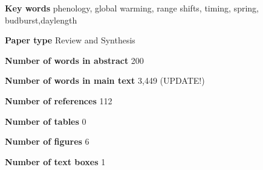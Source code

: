 \documentclass{article}
\begin{document}
\textbf{Key words} phenology, global warming, range shifts, timing, spring, budburst,daylength 

\textbf{Paper type} Review and Synthesis

\textbf{Number of words in abstract} 200

\textbf{Number of words in main text} 3,449 (UPDATE!)

\textbf{Number of references} 112

\textbf{Number of tables} 0

\textbf{Number of figures} 6

\textbf{Number of text boxes} 1







\newpage
\linenumbers
\end{document}

